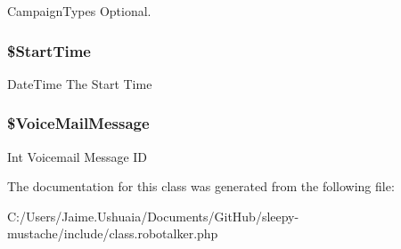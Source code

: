 Campaign\-Types Optional. \hypertarget{class_schedule_calls_request_of_int32_a2f8fa05008bd8e80ae9cb79699e0ed2c}{
\subsubsection[{\$\-Start\-Time}]{\setlength{\rightskip}{0pt plus 5cm}\$Start\-Time}}\label{class_schedule_calls_request_of_int32_a2f8fa05008bd8e80ae9cb79699e0ed2c}
Date\-Time The Start Time \hypertarget{class_schedule_calls_request_of_int32_ab8946a1492b48b7d64a4e6f298903f74}{
\subsubsection[{\$\-Voice\-Mail\-Message}]{\setlength{\rightskip}{0pt plus 5cm}\$Voice\-Mail\-Message}}\label{class_schedule_calls_request_of_int32_ab8946a1492b48b7d64a4e6f298903f74}
Int Voicemail Message I\-D 

The documentation for this class was generated from the following file\-:\begin{DoxyCompactItemize}
\item 
C\-:/\-Users/\-Jaime.\-Ushuaia/\-Documents/\-Git\-Hub/sleepy-\/mustache/include/class.\-robotalker.\-php\end{DoxyCompactItemize}
